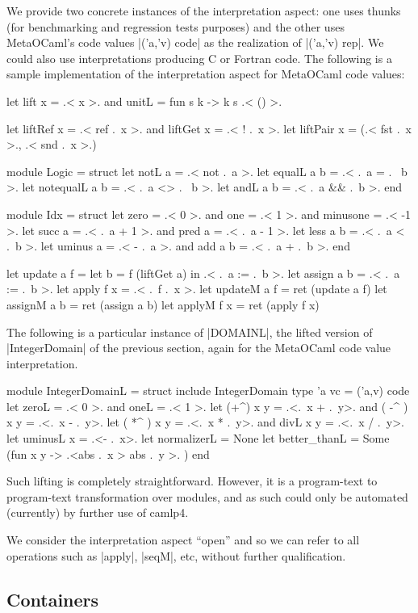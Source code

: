 \documentclass{elsart}
\begin{document}
We provide two concrete instances of the interpretation aspect: one
uses thunks (for benchmarking and regression tests purposes) and the
other uses MetaOCaml's code values |('a,'v) code| as the realization
of |('a,'v) rep|. We could also use interpretations producing C or 
Fortran code. The following is a sample implementation of the
interpretation aspect for MetaOCaml code values:
\begin{code}
let lift x = .< x >.   and  unitL = fun s k -> k s .< () >.

let liftRef x = .< ref .~x >.  and   liftGet x = .< ! .~x >. 
let liftPair x = (.< fst .~x >., .< snd .~x >.)

module Logic = struct
  let notL a        = .< not .~a >.
  let equalL a b    = .< .~a = .~ b >.
  let notequalL a b = .< .~a <> .~ b >.
  let andL a b      = .< .~a && .~b >. 
end

module Idx = struct
  let zero = .< 0 >. and one = .< 1 >. and minusone = .< -1 >.
  let succ a = .< .~a + 1 >.  and  pred a = .< .~a - 1 >.
  let less a b = .< .~a < .~b >.
  let uminus a = .< - .~a >.  and  add a b = .< .~a + .~b >.
end

let update a f = let b = f (liftGet a) in .< .~a := .~b >.
let assign a b = .< .~a := .~b >.
let apply  f x = .< .~f .~x >.
let updateM a f = ret (update a f)
let assignM a b = ret (assign a b)
let applyM  f x = ret (apply f x)
\end{code}
The following is a particular instance of |DOMAINL|, the lifted
version of |IntegerDomain| of the previous section, again
for the MetaOCaml code value interpretation.
\begin{code}
module IntegerDomainL = struct
    include IntegerDomain
    type 'a vc = ('a,v) code
    let zeroL = .< 0 >.  and oneL = .< 1 >. 
    let (+^) x y = .<.~x + .~y>. and ( -^ ) x y = .<.~x - .~y>.
    let ( *^ ) x y = .<.~x * .~y>. and divL x y = .<.~x / .~y>. 
    let uminusL x = .<- .~x>.
    let normalizerL = None
    let better_thanL = Some (fun x y -> .<abs .~x > abs .~y >. )
end
\end{code}
Such lifting is completely straightforward.  However, it is a
program-text to program-text transformation over modules, and as such could
only be automated (currently) by further use of camlp4.

We consider the interpretation aspect ``open'' and so we can
refer to all operations such as |apply|, |seqM|, etc, without further
qualification.


\subsection{Containers}
\end{document}
